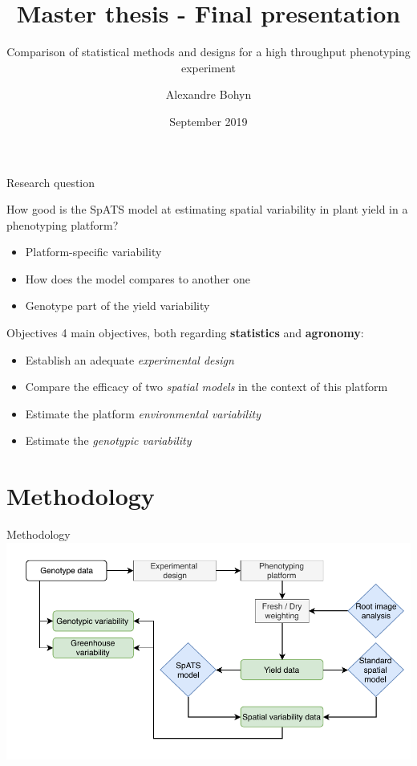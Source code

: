\documentclass[]{beamer}
\title[]{Master thesis - Final presentation}%
\subtitle{Comparison of statistical methods and designs for a high throughput phenotyping experiment}
\author[A.\ Bohyn]{Alexandre Bohyn} %
\date{September 2019} %
\institute[KU Leuven]{Faculty of Science\\ Department of Statistics}
\begin{document}
	{
		\maketitle
	}
	\addtocounter{framenumber}{-1} %

\begin{frame}{Research question}
\begin{kulblock}{
How good is the SpATS model at estimating spatial variability in plant yield in a phenotyping platform?}
\begin{itemize}
    \item Platform-specific variability
    \item How does the model compares to another one
    \item Genotype part of the yield variability
\end{itemize}
\end{kulblock}

\end{frame}

\begin{frame}{Objectives}
4 main objectives, both regarding \textbf{statistics} and \textbf{agronomy}:
\begin{itemize}
    \item Establish an adequate \emph{experimental design}
    \item Compare the efficacy of two \emph{spatial models} in the context of this platform
    \item Estimate the platform \emph{environmental variability}
    \item Estimate the \emph{genotypic variability}
\end{itemize}

\end{frame}

\section{Methodology}
\begin{frame}{Methodology}
    \centering
    \includegraphics[width = \textwidth]{Pictures/methodology.pdf}
\end{frame}
\end{document}
